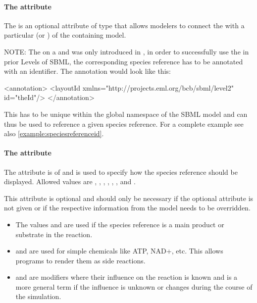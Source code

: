 \paragraph{The  attribute}
The  is an optional attribute of type 
 that allows modelers to connect the \SpeciesReferenceGlyph with 
a particular \SpeciesReference (or \ModifierSpeciesReference) of the 
containing model. 

NOTE: The  on a \SpeciesReference and 
\ModifierSpeciesReference was only introduced in \sbmlthreecore, in 
order to successfully use the  in prior Levels 
of SBML, the corresponding species reference has to be annotated with an 
identifier. The annotation would look like this: 


\begin{example}
	<annotation>
		<layoutId xmlns="http://projects.eml.org/bcb/sbml/level2" id="theId"/>
	</annotation>
\end{example}

This  has to be unique within the global  
namespace of the SBML model and can thus be used to reference a given 
species reference. For a complete example see also 
\ref{example:speciesreferenceid}. 


\paragraph{The  attribute}
\label{attribute:role}
The  attribute is of  and is 
used to specify how the species reference should be displayed. Allowed 
values are , , , 
, , , 
 and . 

This attribute is optional and should only be necessary if the optional 
 attribute is not given or if the respective 
information from the model needs to be overridden. 

\begin{itemize}

	\item { The values  and  are used if 
	the species reference is a main product or substrate in the reaction. } 
	\item {  and  are used for 
	simple chemicals like ATP, NAD+, etc. This allows programs to render 
	them as side reactions. } \item {  and 
	 are modifiers where their influence on the reaction is 
	known and  is a more general term if the influence is 
	unknown or changes during the course of the simulation. } 

\end{itemize}

